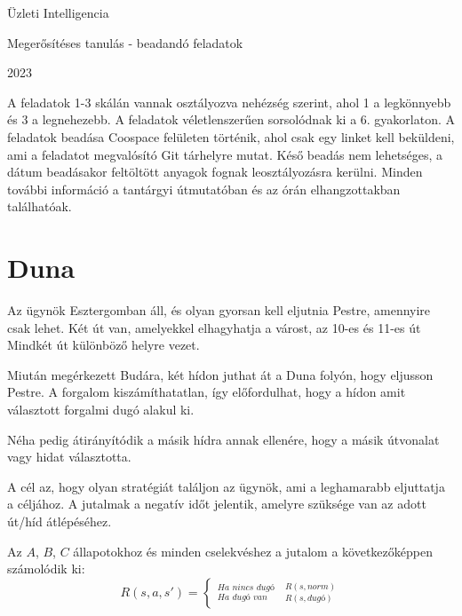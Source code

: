 \documentclass[english]{article}
\begin{document}
\begin{titlepage}
\centering

\vspace{4cm} 

\Huge

Üzleti Intelligencia

\vspace{2cm} 

\Large

Megerősítéses tanulás - beadandó feladatok

\vspace{0.5cm}

2023 %

\vspace{2cm} 

\normalsize

A feladatok 1-3 skálán vannak osztályozva nehézség szerint, ahol 1 a legkönnyebb és 3 a legnehezebb. A feladatok véletlenszerűen sorsolódnak ki a 6. gyakorlaton. A feladatok beadása Coospace felületen történik, ahol csak egy linket kell beküldeni, ami a feladatot megvalósító Git tárhelyre mutat. Késő beadás nem lehetséges, a dátum beadásakor feltöltött anyagok fognak leosztályozásra kerülni. Minden további információ a tantárgyi útmutatóban és az órán elhangzottakban találhatóak.
\end{titlepage}

\section{Duna}
Az ügynök Esztergomban áll, és olyan gyorsan kell eljutnia Pestre, amennyire csak lehet. Két út van, amelyekkel elhagyhatja a várost, az 10-es és 11-es út Mindkét út különböző helyre vezet.

Miután megérkezett Budára, két hídon juthat át a Duna folyón, hogy eljusson Pestre. A forgalom kiszámíthatatlan, így előfordulhat, hogy a hídon amit választott forgalmi dugó alakul ki.

Néha pedig átirányítódik a másik hídra annak ellenére, hogy a másik útvonalat vagy hidat választotta.

A cél az, hogy olyan stratégiát találjon az ügynök, ami a leghamarabb eljuttatja a céljához. A jutalmak a negatív időt jelentik, amelyre szüksége van az adott út/híd átlépéséhez.

Az $A$, $B$, $C$  állapotokhoz és minden cselekvéshez a jutalom a következőképpen számolódik ki:
\[R(s,a,s') = 
\begin{cases}
_{\textit{Ha dugó van}}^{\textit{Ha nincs dugó}} & _{R(s,\textit{dugó})}^{R(s,\textit{norm})}
\end{cases}
\]
\end{document}
